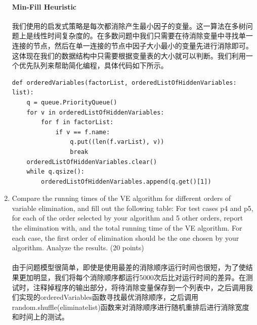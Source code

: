 \documentclass[a4paper, 11pt]{article}
\begin{document}
\begin{enumerate}
\paragraph{Min-Fill Heuristic}
我们使用的启发式策略是每次都消除产生最小因子的变量。这一算法在多树问题上是线性时间复杂度的。在多数问题中我们只需要在待消除变量中寻找单一连接的节点，然后在单一连接的节点中因子大小最小的变量先进行消除即可。这体现在我们的数据结构中只需要根据变量表的大小就可以判断。我们利用一个优先队列来帮助简化编程，具体代码如下所示。
\newline
{}
\begin{lstlisting}
def orderedVariables(factorList, orderedListOfHiddenVariables: list):
    q = queue.PriorityQueue()
    for v in orderedListOfHiddenVariables:
        for f in factorList:
            if v == f.name:
                q.put((len(f.varList), v))
                break
    orderedListOfHiddenVariables.clear()
    while q.qsize():
        orderedListOfHiddenVariables.append(q.get()[1])

\end{lstlisting}

\item Compare the running times of the VE algorithm for different orders of variable elimination, and fill out the following table: For test cases p4 and p5, for each of the order selected by your algorithm and 5 other orders, report the elimination with, and the total running time of the VE algorithm. For each case, the first order of elimination should be the one chosen by your algorithm. Analyze the results. (20 points)
\paragraph{} 由于问题模型很简单，即使是使用最差的消除顺序运行时间也很短，为了使结果更加明显，我们将每个消除顺序都运行5000次后比对运行时间的差异。在测试时，注释掉程序的输出部分，将待消除变量保存到一个列表中，之后调用我们实现的orderedVariables函数寻找最优消除顺序，之后调用random.shuffle(eliminatelist)函数来对消除顺序进行随机重排后进行消除宽度和时间上的测试。

\end{enumerate}
\end{document}

